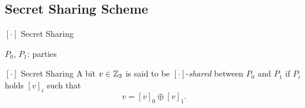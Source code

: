 \documentclass[../240906_cryptlab_flute.tex]{subfiles}
\begin{document}

\subsection{Secret Sharing Scheme}
\begin{frame}{\([\cdot]\) Secret Sharing}
    \centerline{\(P_0\), \(P_1\): parties}
    \begin{block}{\([\cdot]\) Secret Sharing}
        A bit \(v \in \mathbb{Z}_2\) is said to be \([\cdot]\)-\emph{shared}
        between \(P_0\) and \(P_1\) if \(P_i\) holds \([v]_i\) such that
        \[v = [v]_0 \oplus [v]_1.\]
    \end{block}

\end{frame}
\end{document}

